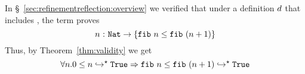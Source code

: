 


%
In \S~\ref{sec:refinementreflection:overview} we verified that
under a definition $d$ that includes \fibname,
the term \fibincrname proves
$${{n} \ \text{:}\ {\mathtt{Nat}} \rightarrow {\{\ensuremath{\texttt{fib}\ {n}} \leq \ensuremath{\texttt{fib}\ {(n+1)}}\}}}$$
%
Thus, by Theorem~\ref{thm:validity} we get
%
$$
\forall n. {0 \leq n}\hookrightarrow^{\star}{\mathtt{True}} \Rightarrow {\ensuremath{\texttt{fib}\ {n}} \leq \ensuremath{\texttt{fib}\ {(n+1)}}}\hookrightarrow^{\star}{\mathtt{True}}
$$
